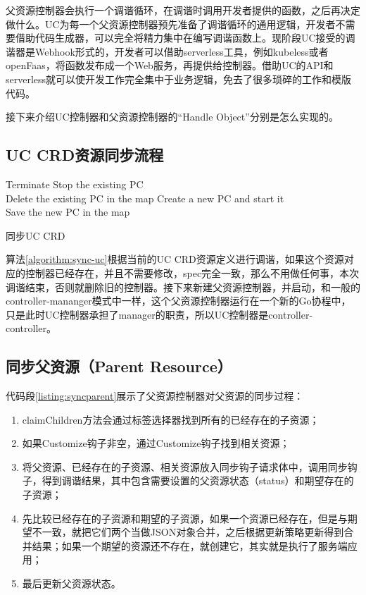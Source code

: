 \documentclass[macfonts,master]{njuthesis}
\begin{document}
父资源控制器会执行一个调谐循环，在调谐时调用开发者提供的函数，之后再决定做什么。UC为每一个父资源控制器预先准备了调谐循环的通用逻辑，开发者不需要借助代码生成器，可以完全将精力集中在编写调谐函数上。现阶段UC接受的调谐器是Webhook形式的，开发者可以借助serverless工具，例如kubeless或者openFaas，将函数发布成一个Web服务，再提供给控制器。借助UC的API和serverless就可以使开发工作完全集中于业务逻辑，免去了很多琐碎的工作和模版代码。


接下来介绍UC控制器和父资源控制器的``Handle Object''分别是怎么实现的。

\subsection{UC CRD资源同步流程}

\begin{algorithm}[H]
\small
\DontPrintSemicolon
    {
        {Terminate}
       	\Else
       	{
          Stop the existing PC\\
          Delete the existing PC in the map
        }
    }
  \Else
  {
    Create a new PC and start it\\
    Save the new PC in the map   
  } 
\caption{同步UC CRD}
\label{algorithm:sync-uc}
\end{algorithm}

算法\ref{algorithm:sync-uc}根据当前的UC CRD资源定义进行调谐，如果这个资源对应的控制器已经存在，并且不需要修改，spec完全一致，那么不用做任何事，本次调谐结束，否则就删除旧的控制器。接下来新建父资源控制器，并启动，和一般的controller-mananger模式中一样，这个父资源控制器运行在一个新的Go协程中，只是此时UC控制器承担了manager的职责，所以UC控制器是controller-controller。

\subsection{同步父资源（Parent Resource）}


代码段\ref{listing:syncparent}展示了父资源控制器对父资源的同步过程：
\begin{enumerate}
	\item claimChildren方法会通过标签选择器找到所有的已经存在的子资源；
	\item 如果Customize钩子非空，通过Customize钩子找到相关资源；
	\item 将父资源、已经存在的子资源、相关资源放入同步钩子请求体中，调用同步钩子，得到调谐结果，其中包含需要设置的父资源状态（status）和期望存在的子资源；
	\item 先比较已经存在的子资源和期望的子资源，如果一个资源已经存在，但是与期望不一致，就把它们两个当做JSON对象合并，之后根据更新策略更新得到合并结果；如果一个期望的资源还不存在，就创建它，其实就是执行了服务端应用；
	\item 最后更新父资源状态。
\end{enumerate}
\end{document}
